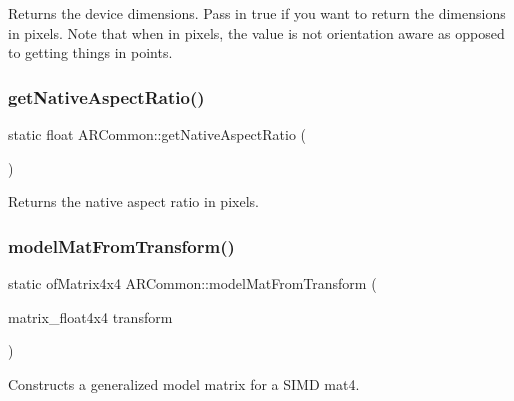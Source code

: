 Returns the device dimensions. Pass in true if you want to return the dimensions in pixels. Note that when in pixels, the value is not orientation aware as opposed to getting things in points. \mbox{\label{namespace_a_r_common_a00f3449531f154cba4a751128117052f}} 
\subsubsection{\texorpdfstring{get\+Native\+Aspect\+Ratio()}{getNativeAspectRatio()}}
{\footnotesize\ttfamily static float A\+R\+Common\+::get\+Native\+Aspect\+Ratio (\begin{DoxyParamCaption}{ }\end{DoxyParamCaption})\hspace{0.3cm}{\ttfamily [static]}}



Returns the native aspect ratio in pixels. 

\mbox{\label{namespace_a_r_common_aec58705c71590506c5f1f86e927f11e1}} 
\subsubsection{\texorpdfstring{model\+Mat\+From\+Transform()}{modelMatFromTransform()}}
{\footnotesize\ttfamily static of\+Matrix4x4 A\+R\+Common\+::model\+Mat\+From\+Transform (\begin{DoxyParamCaption}\item[{matrix\+\_\+float4x4}]{transform }\end{DoxyParamCaption})\hspace{0.3cm}{\ttfamily [static]}}



Constructs a generalized model matrix for a S\+I\+MD mat4. 

\mbox{\label{namespace_a_r_common_acc8f469a4596dc7173993ce58068bd2d}} 
